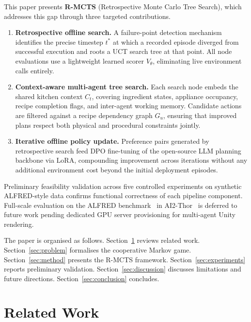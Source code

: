 \documentclass[pdflatex,sn-mathphys-num]{sn-jnl}
\theoremstyle{thmstyleone}
\theoremstyle{thmstyletwo}
\theoremstyle{thmstylethree}
\newcommand{\RMCTS}{\textsc{R-MCTS}}
\newcommand{\Vtheta}{V_{\!\theta}}
\newcommand{\Ct}{C_{t}}
\newcommand{\Gu}{G_{u}}
\begin{document}
This paper presents \textbf{\RMCTS{}} (Retrospective Monte Carlo Tree
Search), which addresses this gap through three targeted contributions.

\begin{enumerate}

\item \textbf{Retrospective offline search.}
A failure-point detection mechanism identifies the precise timestep
$t^*$ at which a recorded episode diverged from successful execution
and roots a UCT search tree at that point.
All node evaluations use a lightweight learned scorer $\Vtheta$,
eliminating live environment calls entirely.

\item \textbf{Context-aware multi-agent tree search.}
Each search node embeds the shared kitchen context $\Ct$, covering
ingredient states, appliance occupancy, recipe completion flags, and
inter-agent working memory. Candidate actions are filtered against a
recipe dependency graph $\Gu$, ensuring that improved plans respect
both physical and procedural constraints jointly.

\item \textbf{Iterative offline policy update.}
Preference pairs generated by retrospective search feed DPO fine-tuning
of the open-source LLM planning backbone via LoRA, compounding
improvement across iterations without any additional environment cost
beyond the initial deployment episodes.

\end{enumerate}

Preliminary feasibility validation across five controlled experiments
on synthetic ALFRED-style data confirms functional correctness of each
pipeline component. Full-scale evaluation on the ALFRED
benchmark~\cite{shridhar2020alfred} in AI2-Thor~\cite{kolve2017ai2thor}
is deferred to future work pending dedicated GPU server provisioning for
multi-agent Unity rendering.

The paper is organised as follows. Section~\ref{sec:related} reviews
related work. Section~\ref{sec:problem} formalises the cooperative
Markov game. Section~\ref{sec:method} presents the \RMCTS{} framework.
Section~\ref{sec:experiments} reports preliminary validation.
Section~\ref{sec:discussion} discusses limitations and future
directions. Section~\ref{sec:conclusion} concludes.

\section{Related Work}\label{sec:related}
\end{document}
